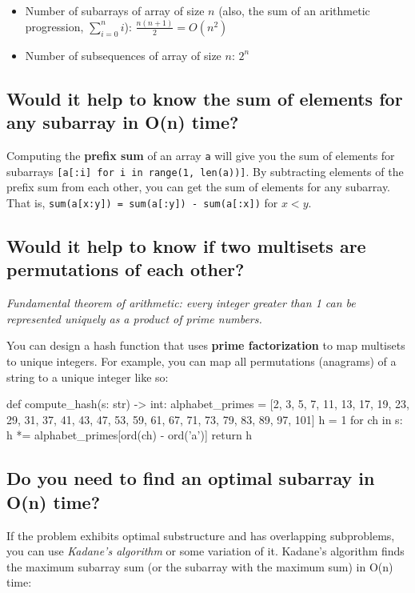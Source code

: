 \documentclass[12pt, titlepage]{article}
\begin{document}
\begin{itemize}
  \item Number of subarrays of array of size $n$ (also, the sum of an arithmetic progression, $\sum_{i=0}^{n}i$): $\frac{n(n+1)}{2} = O(n^2)$
  \item Number of subsequences of array of size $n$: $2^n$
\end{itemize}

\subsection{Would it help to know the sum of elements for any subarray in O(n) time?}

Computing the \textbf{prefix sum} of an array \texttt{a} will give you the sum of elements for subarrays \texttt{[a[:i] for i in range(1, len(a))]}. By subtracting elements of the prefix sum from each other, you can get the sum of elements for any subarray. That is, \texttt{sum(a[x:y]) = sum(a[:y]) - sum(a[:x])} for $x < y$. \\

\subsection{Would it help to know if two multisets are permutations of each other?}

\textit{Fundamental theorem of arithmetic: every integer greater than 1 can be represented uniquely as a product of prime numbers.} \medskip

You can design a hash function that uses \textbf{prime factorization} to map multisets to unique integers. For example, you can map all permutations (anagrams) of a string to a unique integer like so: \medskip

\begin{python}
def compute_hash(s: str) -> int:
    alphabet_primes = [2, 3, 5, 7, 11, 13, 17, 19, 23, 29,
                       31, 37, 41, 43, 47, 53, 59, 61, 67,
                       71, 73, 79, 83, 89, 97, 101]
    h = 1
    for ch in s:
        h *= alphabet_primes[ord(ch) - ord('a')]
    return h
\end{python} \bigskip

\subsection{Do you need to find an optimal subarray in O(n) time?}

If the problem exhibits optimal substructure and has overlapping subproblems, you can use \textit{Kadane's algorithm} or some variation of it. Kadane's algorithm finds the maximum subarray sum (or the subarray with the maximum sum) in O(n) time: \medskip
\end{document}

